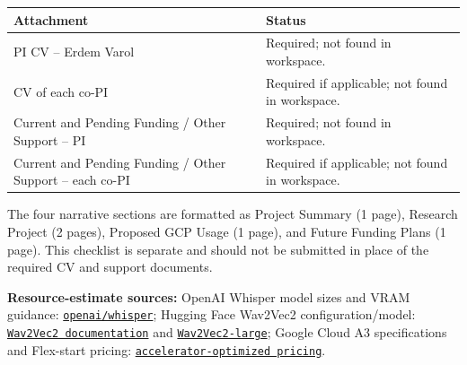\documentclass[10pt]{article}
\newcommand{\sourceurl}[2]{\href{#1}{\texttt{#2}}}
\begin{document}
\begin{center}
\begin{tabularx}{\linewidth}{>{\raggedright\arraybackslash}p{3.0in}X}
\toprule
\textbf{Attachment} & \textbf{Status}\\
\midrule
PI CV -- Erdem Varol & Required; not found in workspace.\\
CV of each co-PI & Required if applicable; not found in workspace.\\
Current and Pending Funding / Other Support -- PI & Required; not found in workspace.\\
Current and Pending Funding / Other Support -- each co-PI & Required if applicable; not found in workspace.\\
\bottomrule
\end{tabularx}
\end{center}

The four narrative sections are formatted as Project Summary (1 page), Research Project (2 pages), Proposed GCP Usage (1 page), and Future Funding Plans (1 page). This checklist is separate and should not be submitted in place of the required CV and support documents.

\vfill
\small\textbf{Resource-estimate sources:} OpenAI Whisper model sizes and VRAM guidance: \sourceurl{https://github.com/openai/whisper/blob/main/README.md}{openai/whisper}; Hugging Face Wav2Vec2 configuration/model: \sourceurl{https://huggingface.co/docs/transformers/model_doc/wav2vec2}{Wav2Vec2 documentation} and \sourceurl{https://huggingface.co/facebook/wav2vec2-large}{Wav2Vec2-large}; Google Cloud A3 specifications and Flex-start pricing: \sourceurl{https://cloud.google.com/products/compute/pricing/accelerator-optimized}{accelerator-optimized pricing}.
\end{document}
